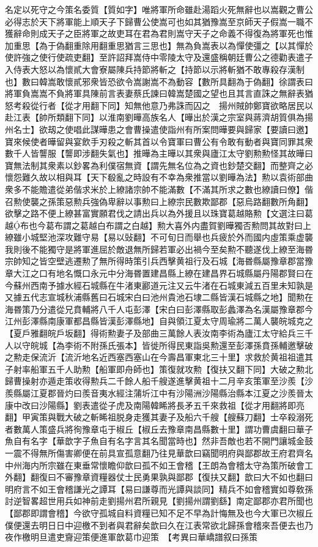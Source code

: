 名定以死守之今策名委質【質如字】唯將軍所命雖赴湯蹈火死無辭也以嵩觀之曹公必得志於天下將軍能上順天子下歸曹公使嵩可也如其猶豫嵩至京師天子假嵩一職不獲辭命則成天子之臣將軍之故吏耳在君為君則嵩守天子之命義不得復為將軍死也惟加重思【為于偽翻重除用翻重思猶言三思也】無為負嵩表以為憚使彊之【以其憚於使許強之使行使疏吏翻】至許詔拜嵩侍中零陵太守及還盛稱朝廷曹公之德勸表遣子入侍表大怒以為懷貳大會寮屬陳兵持節將斬之【持節以示將斬猶不敢專殺存漢制也】數曰韓嵩敢懷貳邪衆皆恐欲令嵩謝嵩不為動容【數所具翻為于偽翻】徐謂表曰將軍負嵩嵩不負將軍具陳前言表妻蔡氏諫曰韓嵩楚國之望也且其言直誅之無辭表猶怒考殺從行者【從才用翻下同】知無他意乃弗誅而囚之　揚州賊帥鄭寶欲略居民以赴江表【帥所類翻下同】以淮南劉曄高族名人【曄出於漢之宗室與蔣濟胡質俱為揚州名士】欲刼之使唱此謀曄患之會曹操遣使詣州有所案問曄要與歸家【要讀曰邀】寶來候使者曄留與宴飲手刃殺之斬其首以令寶軍曰曹公有令敢有動者與寶同罪其衆數千人皆讋服【讋即涉翻失氣也】推曄為主曄以其衆與廬江太守劉勲勲怪其故曄曰寶無法制其衆素以鈔畧為利僕宿無資【謂先無名位為之資也鈔楚交翻】而整齊之必懷怨難久故以相與耳【天下殽亂之時設有不幸為衆推當以劉曄為法】勲以袁術部曲衆多不能贍遣從弟偕求米於上繚諸宗帥不能滿數【不滿其所求之數也繚讀曰僚】偕召勲使襲之孫策惡勲兵強偽卑辭以事勲曰上繚宗民數欺鄙郡【惡烏路翻數所角翻】欲擊之路不便上繚甚富實願君伐之請出兵以為外援且以珠寶葛越賂勲【文選注曰葛越布也今葛布謂之葛越白布謂之白越】勲大喜外内盡賀劉曄獨否勲問其故對曰上繚雖小城堅池深攻難守易【易以䜴翻】不可旬日而舉也兵疲於外而國内虛策乘虚襲我則後不能獨守是將軍進屈於敵退無所歸若軍必出禍今至矣勲不聽遂伐上繚至海昬宗帥知之皆空壁逃遷勲了無所得時策引兵西擊黄祖行及石城【海昬縣屬豫章郡當豫章大江之口有地名慨口永元中分海昬置建昌縣上繚在建昌界石城縣屬丹陽郡賢曰在今蘇州西南予據水經石城縣在牛渚東酈道元注又云牛渚在石城東減五百里未知孰是又據五代志宣城秋浦縣舊曰石城宋白曰池州貴池石埭二縣皆漢石城縣之地】聞勲在海昬策乃分遣從兄賁輔將八千人屯彭澤【宋白曰彭澤縣取彭蠡澤為名漢屬豫章郡今江州彭澤縣南康軍都昌縣皆漢彭澤縣地】自與領江夏太守周瑜將二萬人襲皖城克之【夏戶雅翻皖戶坂翻】得術勲妻子及部曲三萬餘人表汝南李術為廬江太守給兵三千人以守皖城【為李術不附孫氏張本】皆徙所得民東詣吳勲還至彭澤孫賁孫輔邀擊破之勲走保流沂【流沂地名近西塞西塞山在今壽昌軍東北三十里】求救於黄祖祖遣其子射率船軍五千人助勲【船軍即舟師也】策復就攻勲【復扶又翻下同】大破之勲北歸曹操射亦遁走策收得勲兵二千餘人船千艘遂進擊黄祖十二月辛亥策軍至沙羨【沙羨縣屬江夏郡晉灼曰羨音夷水經注蒲圻江中有沙陽洲沙陽縣治縣本江夏之沙羨晉太康中改曰沙陽縣】劉表遣從子虎及南陽韓睎將長矛五千來救祖【從才用翻將即亮翻】甲寅策與戰大破之斬睎祖脱身走獲其妻子及船六千艘【艘蘇刀翻】士卒殺溺死者數萬人策盛兵將徇豫章屯于椒丘【椒丘去豫章南昌縣數十里】謂功曹虞翻曰華子魚自有名字【華歆字子魚自有名字言其名聞當時也】然非吾敵也若不開門讓城金鼓一震不得無所傷害卿便在前具宣孤意翻乃往見華歆曰竊聞明府與鄙郡故王府君齊名中州海内所宗雖在東垂常懷瞻仰歆曰孤不如王會稽【王朗為會稽太守為策所破會工外翻】翻復曰不審豫章資糧器仗士民勇果孰與鄙郡【復扶又翻】歆曰大不如也翻曰明府言不如王會稽謙光之譚耳【易曰謙尊而光譚與談同】精兵不如會稽實如尊敎孫討逆智畧超世用兵如神前走劉揚州君所親見【劉揚州謂劉繇】南定鄙郡亦君所聞也【鄙郡即謂會稽】今欲守孤城自料資糧已知不足不早為計悔無及也今大軍已次椒丘僕便還去明日日中迎檄不到者與君辭矣歆曰久在江表常欲北歸孫會稽來吾便去也乃夜作檄明旦遣吏齎迎策便進軍歆葛巾迎策　【考異曰華嶠譜叙曰孫策